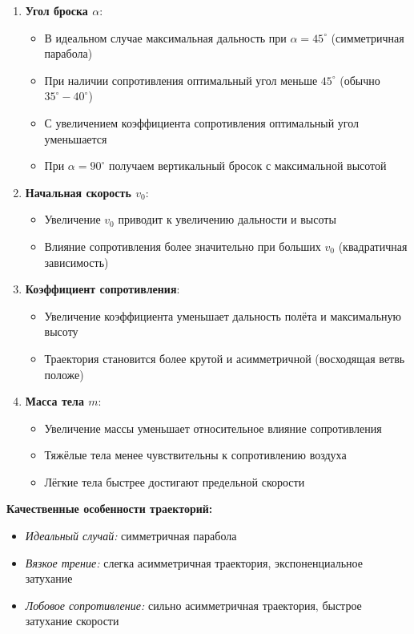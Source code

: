 \begin{enumerate}
    \item \textbf{Угол броска $\alpha$}: 
    \begin{itemize}
        \item В идеальном случае максимальная дальность при $\alpha = 45^\circ$ (симметричная парабола)
        \item При наличии сопротивления оптимальный угол меньше $45^\circ$ (обычно $35^\circ-40^\circ$)
        \item С увеличением коэффициента сопротивления оптимальный угол уменьшается
        \item При $\alpha = 90^\circ$ получаем вертикальный бросок с максимальной высотой
    \end{itemize}
    
    \item \textbf{Начальная скорость $v_0$}:
    \begin{itemize}
        \item Увеличение $v_0$ приводит к увеличению дальности и высоты
        \item Влияние сопротивления более значительно при больших $v_0$ (квадратичная зависимость)
    \end{itemize}
    
    \item \textbf{Коэффициент сопротивления}:
    \begin{itemize}
        \item Увеличение коэффициента уменьшает дальность полёта и максимальную высоту
        \item Траектория становится более крутой и асимметричной (восходящая ветвь положе)
    \end{itemize}
    
    \item \textbf{Масса тела $m$}:
    \begin{itemize}
        \item Увеличение массы уменьшает относительное влияние сопротивления
        \item Тяжёлые тела менее чувствительны к сопротивлению воздуха
        \item Лёгкие тела быстрее достигают предельной скорости
    \end{itemize}
\end{enumerate}

\textbf{Качественные особенности траекторий:}
\begin{itemize}
    \item \textit{Идеальный случай:} симметричная парабола
    \item \textit{Вязкое трение:} слегка асимметричная траектория, экспоненциальное затухание
    \item \textit{Лобовое сопротивление:} сильно асимметричная траектория, быстрое затухание скорости
\end{itemize}

\newpage
